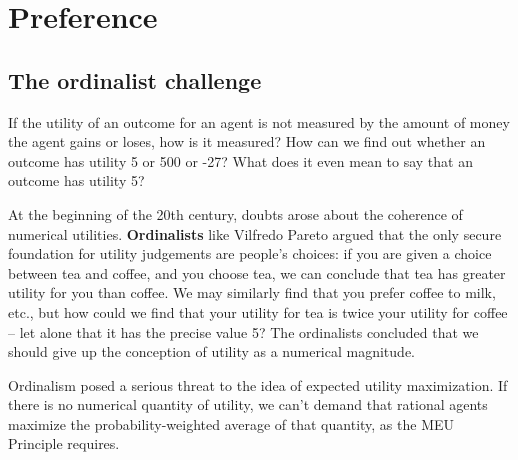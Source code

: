 \chapter{Preference}\label{ch:preference}


%

\section{The ordinalist challenge}

If the utility of an outcome for an agent is not measured by the
amount of money the agent gains or loses, how is it measured? How can
we find out whether an outcome has utility 5 or 500 or -27? What does
it even mean to say that an outcome has utility 5?

At the beginning of the 20th century, doubts arose about the coherence
of numerical utilities. \textbf{Ordinalists} like Vilfredo Pareto
argued that the only secure foundation for utility judgements are
people's choices: if you are given a choice between tea and coffee,
and you choose tea, we can conclude that tea has greater utility for
you than coffee. We may similarly find that you prefer coffee to milk,
etc., but how could we find that your utility for tea is twice your
utility for coffee -- let alone that it has the precise value 5? The
ordinalists concluded that we should give up the conception of utility
as a numerical magnitude.


Ordinalism posed a serious threat to the idea of expected utility
maximization. If there is no numerical quantity of utility, we can't
demand that rational agents maximize the probability-weighted average
of that quantity, as the MEU Principle requires.

